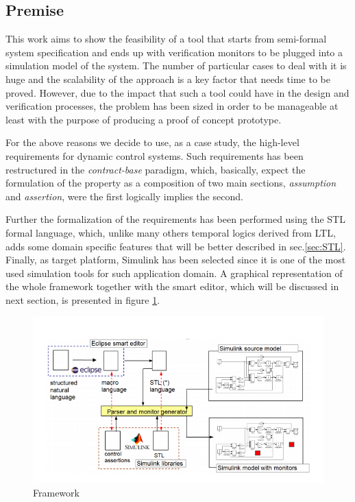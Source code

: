 \subsection{Premise}
This work aims to show the feasibility of a tool that starts from semi-formal system specification and ends up with verification monitors to be plugged into a simulation model of the system. The number of particular cases to deal with it is huge and the scalability of the approach is a key factor that needs time to be proved. However, due to the impact that such a tool could have in the design and verification processes, the problem has been sized in order to be manageable at least with the purpose of producing a proof of concept prototype.
\par For the above reasons we decide to use, as a case study, the high-level requirements for dynamic control systems. Such requirements has been restructured in the \textit{contract-base} paradigm, which, basically, expect the formulation of the property as a composition of two main sections, \textit{assumption} and \textit{assertion}, were the first logically implies the second.
\par Further the formalization of the requirements has been performed using the STL formal language, which, unlike many others temporal logics derived from LTL, adds some domain specific features that will be better described in sec.\ref{sec:STL}. Finally, as target platform, Simulink has been selected since it is one of the most used simulation tools for such application domain. A graphical representation of the whole framework together with the smart editor, which will be discussed in next section, is presented in figure \ref{fig:framework}.

\begin{figure}[!h]
	\centering 
     \includegraphics[width=1\textwidth]{Figs/framework.png} 
     \caption{Framework} 
     \label{fig:framework} 
\end{figure}

